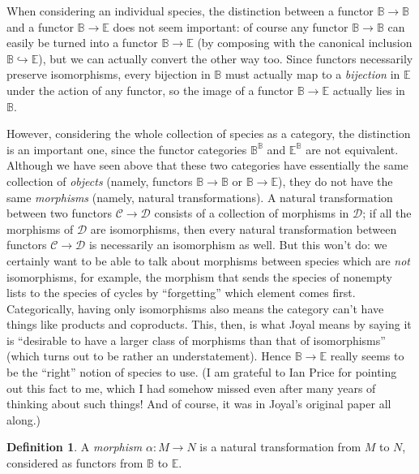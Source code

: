 \documentclass{amsart}
\theoremstyle{definition}
\newtheorem{defn}[thm]{Definition}
\theoremstyle{remark}
\newcommand{\B}{\mathbb{B}}
\newcommand{\E}{\mathbb{E}}
\newcommand{\inj}{\hookrightarrow}
\begin{document}
\begin{commentary}
  When considering an individual species, the distinction between a
  functor $\B \to \B$ and a functor $\B \to \E$ does not seem
  important: of course any functor $\B \to \B$ can easily be turned
  into a functor $\B \to \E$ (by composing with the canonical
  inclusion $\B \inj \E$), but we can actually convert the other way
  too.  Since functors necessarily preserve isomorphisms, every
  bijection in $\B$ must actually map to a \emph{bijection} in $\E$
  under the action of any functor, so the image of a functor
  $\B \to \E$ actually lies in $\B$.

  However, considering the whole collection of species as a category,
  the distinction is an important one, since the functor categories
  $\B^\B$ and $\E^\B$ are not equivalent.  Although we have seen above
  that these two categories have essentially the same collection of
  \emph{objects} (namely, functors $\B \to \B$ or $\B \to \E$), they
  do not have the same \emph{morphisms} (namely, natural
  transformations).  A natural transformation between two functors
  $\mathcal{C} \to \mathcal{D}$ consists of a collection of morphisms
  in $\mathcal{D}$; if all the morphisms of $\mathcal{D}$ are
  isomorphisms, then every natural transformation between functors
  $\mathcal{C} \to \mathcal{D}$ is necessarily an isomorphism as well.
  But this won't do: we certainly want to be able to talk about
  morphisms between species which are \emph{not} isomorphisms, for
  example, the morphism that sends the species of nonempty lists to
  the species of cycles by ``forgetting'' which element comes first.
  Categorically, having only isomorphisms also means the category
  can't have things like products and coproducts.  This, then, is what
  Joyal means by saying it is ``desirable to have a larger class of
  morphisms than that of isomorphisms'' (which turns out to be
  rather an understatement).  Hence $\B \to \E$ really seems to
  be the ``right'' notion of species to use.  (I am grateful to Ian
  Price for pointing out this fact to me, which I had somehow missed
  even after many years of thinking about such things!  And of course,
  it was in Joyal's original paper all along.)
\end{commentary}

\begin{defn}
  A \emph{morphism} $\alpha : M \to N$ is a natural transformation
  from $M$ to $N$, considered as functors from $\B$ to $\E$.
\end{defn}
\end{document}
